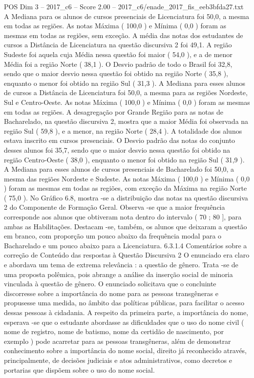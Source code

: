 \begin{textsample}{POS Dim 3 – 2017\_c6 – Score 2.00 – 2017\_c6/enade\_2017\_fis\_eeb3bfda27.txt}
A Mediana para os alunos de cursos presenciais de Licenciatura foi 50,0, a mesma em todas as regiões.
As notas Máxima ( 100,0 ) e Mínima ( 0,0 ) foram as mesmas em todas as regiões, sem exceção.
A média das notas dos estudantes de cursos a Distância de Licenciatura na questão discursiva 2 foi 49,1.
A região Sudeste foi aquela cuja Média nessa questão foi maior ( 54,0 ), e a de menor Média foi a região Norte ( 38,1 ).
O Desvio padrão de todo o Brasil foi 32,8, sendo que o maior desvio nessa questão foi obtido na região Norte ( 35,8 ), enquanto o menor foi obtido na região Sul ( 31,3 ).
A Mediana para esses alunos de cursos a Distância de Licenciatura foi 50,0, a mesma para as regiões Nordeste, Sul e Centro-Oeste.
As notas Máxima ( 100,0 ) e Mínima ( 0,0 ) foram as mesmas em todas as regiões.
A desagregação por Grande Região para as notas de Bacharelado, na questão discursiva 2, mostra que a maior Média foi observada na região Sul ( 59,8 ), e a menor, na região Norte ( 28,4 ).
A totalidade dos alunos estava inscrito em cursos presenciais.
O Desvio padrão das notas do conjunto desses alunos foi 35,7, sendo que o maior desvio nessa questão foi obtido na região Centro-Oeste ( 38,0 ), enquanto o menor foi obtido na região Sul ( 31,9 ).
A Mediana para esses alunos de cursos presenciais de Bacharelado foi 50,0, a mesma das regiões Nordeste e Sudeste.
As notas Máxima ( 100,0 ) e Mínima ( 0,0 ) foram as mesmas em todas as regiões, com exceção da Máxima na região Norte ( 75,0 ).
No Gráfico 6.8, mostra -se a distribuição das notas na questão discursiva 2 do Componente de Formação Geral.
Observa -se que a maior frequência corresponde aos alunos que obtiveram nota dentro do intervalo ( 70 ; 80 ], para ambas as Habilitações.
Destacam -se, também, os alunos que deixaram a questão em branco, com proporção um pouco abaixo da frequência modal para o Bacharelado e um pouco abaixo para a Licenciatura. 6.3.1.4 Comentários sobre a correção de Conteúdo das respostas à Questão Discursiva 2 O enunciado era claro e abordava um tema de extrema relevância : a questão de gênero.
Trata -se de uma proposta polêmica, pois abrange a análise da inserção social de minoria vinculada à questão de gênero.
O enunciado solicitava que o concluinte discorresse sobre a importância do nome para as pessoas transgêneras e propusesse uma medida, no âmbito das políticas públicas, para facilitar o acesso dessas pessoas à cidadania.
A respeito da primeira parte, a importância do nome, esperava -se que o estudante abordasse as dificuldades que o uso do nome civil ( nome de registro, nome de batismo, nome da certidão de nascimento, por exemplo ) pode acarretar para as pessoas transgêneras, além de demonstrar conhecimento sobre a importância do nome social, direito já reconhecido através, principalmente, de decisões judiciais e atos administrativos, como decretos e portarias que dispõem sobre o uso do nome social.

\end{textsample}
